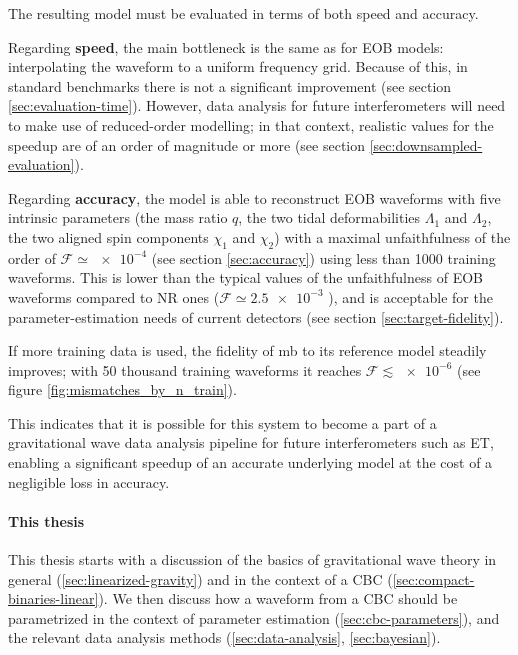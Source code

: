 \documentclass[main.tex]{subfiles}
\begin{document}
The resulting model must be evaluated in terms of both speed and accuracy.

Regarding \textbf{speed}, the main bottleneck is the same as for \ac{EOB} models: interpolating the waveform to a uniform frequency grid. 
Because of this, in standard benchmarks there is not a significant improvement (see section \ref{sec:evaluation-time}). 
However, data analysis for future interferometers will need to make use of reduced-order modelling; in that context, realistic values for the  speedup are of an order of magnitude or more (see section \ref{sec:downsampled-evaluation}). 

Regarding \textbf{accuracy}, the model is able to reconstruct \ac{EOB} waveforms with five intrinsic parameters (the mass ratio \(q\), the two tidal deformabilities \(\Lambda_1\) and \(\Lambda_2 \), the two aligned spin components \(\chi_1 \) and \(\chi_2 \)) with a maximal unfaithfulness of the order of \(\mathcal{F} \simeq \num{e-4}\) (see section \ref{sec:accuracy}) using less than 1000 training waveforms.
This is lower than the typical values of the unfaithfulness of EOB waveforms compared to \ac{NR} ones (\(\mathcal{F} \simeq \num{2.5e-3}\) \cite{nagarTimedomainEffectiveonebodyGravitational2018}), and is acceptable for the parameter-estimation needs of current detectors (see section \ref{sec:target-fidelity}).

If more training data is used, the fidelity of \ac{mb} to its reference model steadily improves; with 50 thousand training waveforms it reaches \(\mathcal{F} \lesssim \num{e-6}\) (see figure \ref{fig:mismatches_by_n_train}). 

This indicates that it is possible for this system to become a part of a gravitational wave data analysis pipeline for future interferometers such as \ac{ET}, enabling a significant speedup of an accurate underlying model at the cost of a negligible loss in accuracy. 


\paragraph{This thesis}

This thesis starts with a discussion of the basics of gravitational wave theory in general (\ref{sec:linearized-gravity}) and in the context of a \ac{CBC} (\ref{sec:compact-binaries-linear}).
We then discuss how a waveform from a \ac{CBC} should be parametrized in the context of parameter estimation (\ref{sec:cbc-parameters}), and the relevant data analysis methods (\ref{sec:data-analysis}, \ref{sec:bayesian}). 
\end{document}
